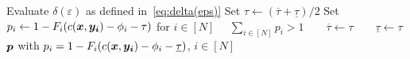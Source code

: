 \documentclass[11pt, a4paper, oneside, reqno]{article}
\begin{document}
\begin{table}[!b]
\begin{minipage}{0.6175\textwidth}
\begin{algorithm}[H]
\begin{algorithmic}[1]
					\State Evaluate $\delta(\varepsilon)$ as defined in~\eqref{eq:delta(eps)}
					\State \hspace{-1ex}Set $\tau \gets {(\overline{\tau} + \underline{\tau})}/{2}$
					\State \hspace{-1ex}Set $p_i \gets 1-F_i(c(\boldsymbol x,\boldsymbol {y_i}) -\phi_i -\tau)$ for $i \in [N]$
					\State \hspace{-1ex}\algorithmicif~~$\sum_{i \in [N]} p_i > 1$~~\algorithmicthen~~$\overline{\tau} \gets \tau$~~\algorithmicelse~~$\underline{\tau} \gets \tau$
					\EndFor	\vspace{0.1em}
					\Ensure $\boldsymbol p $ with $p_i = 1-F_i(c(\boldsymbol x,\boldsymbol {y_i}) -\phi_i -\underline \tau)$, $i\in[N]$
				\end{algorithmic}
			\end{algorithm}
			\vspace{-1em}
		\end{minipage}
	\end{table}
	
\end{document}
